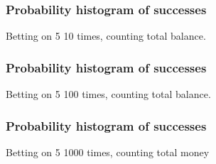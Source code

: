 \documentclass[handout]{beamer}
\begin{document}
   \begin{frame}
   \frametitle{Probability histogram of successes}
   \begin{center}
   \end{center}
   Betting on {\color{red} 5} 10 times, counting total balance.
   \end{frame}



   \begin{frame}
   \frametitle{Probability histogram of successes}
   \begin{center}
   \end{center}
   Betting on {\color{red} 5} 100 times, counting total balance.
   \end{frame}



   \begin{frame}
   \frametitle{Probability histogram of successes}
   \begin{center}
   \end{center}
   Betting on {\color{red} 5} 1000 times, counting total money
   \end{frame}
\end{document}
